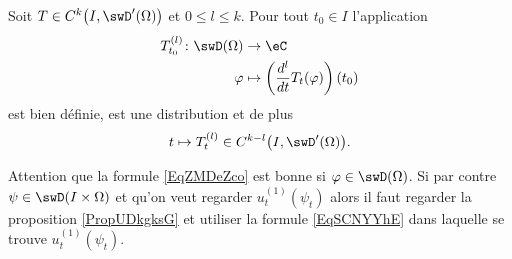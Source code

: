\begin{proposition} \label{PropGKoPbko}
    Soit \( T\in C^k\big( I,\swD'(\Omega) \big)\) et \( 0\leq l\leq k\). Pour tout \( t_0\in I\) l'application
    \begin{equation}    \label{EqZMDeZco}
        \begin{aligned}
            T_{t_0}^{(l)}\colon \swD(\Omega)&\to \eC \\
            \varphi&\mapsto \left(\frac{ d^l  }{ dt }T_t(\varphi)\right)(t_0)
        \end{aligned}
    \end{equation}
    est bien définie, est une distribution et de plus   
    \begin{equation}
        t\mapsto T_t^{(l)}\in C^{k-l}\big( I,\swD'(\Omega) \big).
    \end{equation}
\end{proposition}
Attention que la formule \eqref{EqZMDeZco} est bonne si \( \varphi\in\swD(\Omega)\). Si par contre \( \psi\in\swD(I\times \Omega)\) et qu'on veut regarder \( u_t^{(1)}(\psi_t)\) alors il faut regarder la proposition \ref{PropUDkgksG} et utiliser la formule \eqref{EqSCNYYhE} dans laquelle se trouve \( u_t^{(1)}(\psi_t)\).

